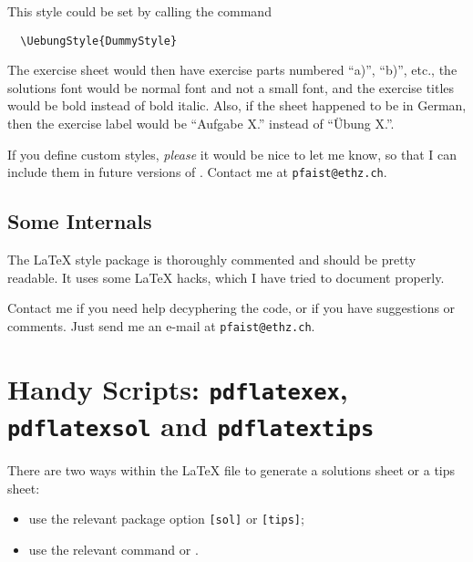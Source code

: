\documentclass[11pt,a4paper]{article}
\begin{document}
This style could be set by calling the command
\begin{pkgverbatim}
\begin{verbatim}
  \UebungStyle{DummyStyle}
\end{verbatim}
\end{pkgverbatim}

The exercise sheet would then have exercise parts numbered ``a)'', ``b)'', etc., the
solutions font would be normal font and not a small font, and the exercise titles would be
bold instead of bold italic. Also, if the sheet happened to be in German, then the
exercise label would be ``Aufgabe X.'' instead of ``\"Ubung X.''.

\begin{pkgnotice}
  If you define custom styles, \emph{please} it would be nice to let me know, so that I
  can include them in future versions of \ethuebung{}. Contact me at
  \texttt{pfaist{@}ethz.ch}.
\end{pkgnotice}






\subsection{Some Internals}
\label{sec:Internals}

The \LaTeX{} style package is thoroughly commented and should be pretty readable. It uses
some \LaTeX{} hacks, which I have tried to document properly.

Contact me if you need help decyphering the code, or if you have suggestions or
comments. Just send me an e-mail at \texttt{pfaist{@}ethz.ch}.


\section{Handy Scripts: \texttt{pdflatexex}, \texttt{pdflatexsol} and \texttt{pdflatextips}}
\label{sec:handyscriptspdflatex}

There are two ways within the \LaTeX{} file to generate a solutions sheet or a tips sheet:
\begin{itemize}
\item use the relevant package option \texttt{[sol]} or \texttt{[tips]};
\item use the relevant command  or
  .
\end{itemize}
\end{document}
